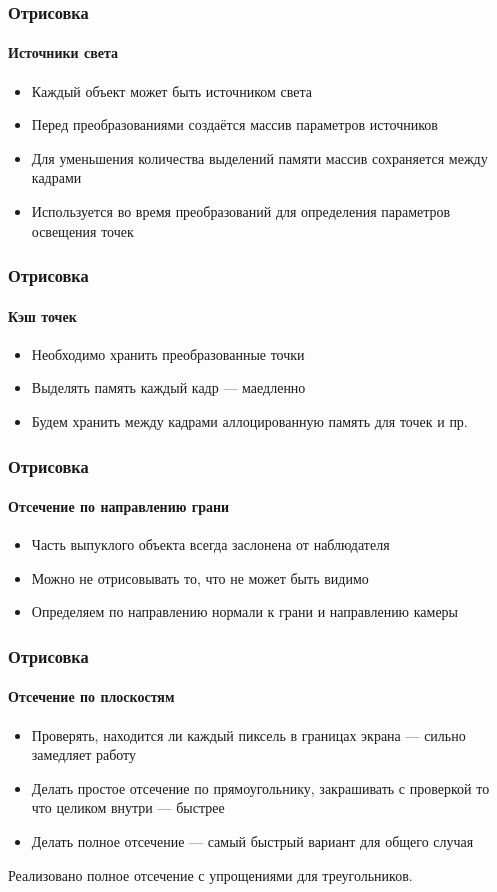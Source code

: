 \documentclass{beamer}
\begin{document}
\begin{frame}
\frametitle{Отрисовка}
\framesubtitle{Источники света}

\begin{itemize}
\item Каждый объект может быть источником света
\item Перед преобразованиями создаётся массив параметров источников
\item Для уменьшения количества выделений памяти массив сохраняется между кадрами
\item Используется во время преобразований для определения параметров освещения точек
\end{itemize}
\end{frame}

\begin{frame}
\frametitle{Отрисовка}
\framesubtitle{Кэш точек}

\begin{itemize}
\item Необходимо хранить преобразованные точки
\item Выделять память каждый кадр --- маедленно
\item Будем хранить между кадрами аллоцированную память для точек и пр.
\end{itemize}
\end{frame}

\begin{frame}
\frametitle{Отрисовка}
\framesubtitle{Отсечение по направлению грани}

\begin{itemize}
\item Часть выпуклого объекта всегда заслонена от наблюдателя
\item Можно не отрисовывать то, что не может быть видимо
\item Определяем по направлению нормали к грани и направлению камеры
\end{itemize}
\end{frame}

\begin{frame}
\frametitle{Отрисовка}
\framesubtitle{Отсечение по плоскостям}

\begin{itemize}
\item Проверять, находится ли каждый пиксель в границах экрана --- сильно замедляет работу
\item Делать простое отсечение по прямоугольнику, закрашивать с проверкой то что целиком внутри --- быстрее
\item Делать полное отсечение --- самый быстрый вариант для общего случая
\end{itemize}
Реализовано полное отсечение с упрощениями для треугольников.
\end{frame}
\end{document}
